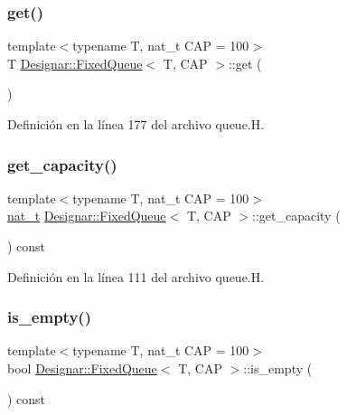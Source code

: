 \subsubsection{\texorpdfstring{get()}{get()}}
{\footnotesize\ttfamily template$<$typename T, nat\+\_\+t C\+AP = 100$>$ \\
T \hyperlink{class_designar_1_1_fixed_queue}{Designar\+::\+Fixed\+Queue}$<$ T, C\+AP $>$\+::get (\begin{DoxyParamCaption}{ }\end{DoxyParamCaption})\hspace{0.3cm}{\ttfamily [inline]}}



Definición en la línea 177 del archivo queue.\+H.

\mbox{\label{class_designar_1_1_fixed_queue_a786767a9a56c0c4b1e93631b509f0fa1}} 
\subsubsection{\texorpdfstring{get\+\_\+capacity()}{get\_capacity()}}
{\footnotesize\ttfamily template$<$typename T, nat\+\_\+t C\+AP = 100$>$ \\
\hyperlink{namespace_designar_aa72662848b9f4815e7bf31a7cf3e33d1}{nat\+\_\+t} \hyperlink{class_designar_1_1_fixed_queue}{Designar\+::\+Fixed\+Queue}$<$ T, C\+AP $>$\+::get\+\_\+capacity (\begin{DoxyParamCaption}{ }\end{DoxyParamCaption}) const\hspace{0.3cm}{\ttfamily [inline]}}



Definición en la línea 111 del archivo queue.\+H.

\mbox{\label{class_designar_1_1_fixed_queue_aa72d9c9dd2ce251b6d29b31c04ee6517}} 
\subsubsection{\texorpdfstring{is\+\_\+empty()}{is\_empty()}}
{\footnotesize\ttfamily template$<$typename T, nat\+\_\+t C\+AP = 100$>$ \\
bool \hyperlink{class_designar_1_1_fixed_queue}{Designar\+::\+Fixed\+Queue}$<$ T, C\+AP $>$\+::is\+\_\+empty (\begin{DoxyParamCaption}{ }\end{DoxyParamCaption}) const\hspace{0.3cm}{\ttfamily [inline]}}



